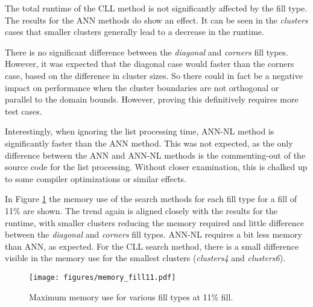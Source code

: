 The total runtime of the CLL method is not significantly affected by the fill type. The results for the ANN methods do show an effect. It can be seen in the {\itshape clusters} cases that smaller clusters generally lead to a decrease in the runtime.

There is no significant difference between the {\itshape diagonal} and {\itshape corners} fill types. However, it was expected that the diagonal case would faster than the corners case, based on the difference in cluster sizes. So there could in fact be a negative impact on performance when the cluster boundaries are not orthogonal or parallel to the domain bounds. However, proving this definitively requires more test cases.

Interestingly, when ignoring the list processing time, ANN-NL method is significantly faster than the ANN method. This was not expected, as the only difference between the ANN and ANN-NL methods is the commenting-out of the source code for the list processing. Without closer examination, this is chalked up to some compiler optimizations or similar effects.

In Figure \ref{FIG:memoryfill11} the memory use of the search methods for each fill type for a fill of 11\% are shown. The trend again is aligned closely with the results for the runtime, with smaller clusters reducing the memory required and little difference between the {\itshape diagonal} and {\itshape corners} fill types. ANN-NL requires a bit less memory than ANN, as expected. For the CLL search method, there is a small difference visible in the memory use for the smallest clusters ({\itshape clusters4} and {\itshape clusters6}). 

\begin{figure}[h]
	\centering
	\texttt{[image: figures/memory\_fill11.pdf]}
	\caption{Maximum memory use for various fill types at 11\% fill.}
	\label{FIG:memoryfill11}
\end{figure}

\begin{table}[htbp]
	\centering
	\renewcommand{\arraystretch}{1.3} %
	
	\label{TABLE:RESULTS}
\end{table}